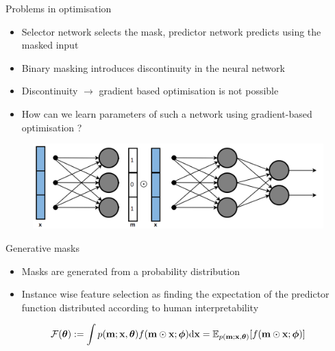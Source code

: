 \documentclass[11pt,compress,t,notes=noshow, aspectratio=169, xcolor=table]{beamer}
\begin{document}
	
\begin{frame}{Problems in optimisation}
    \begin{itemize}
        \item Selector network selects the mask, predictor network predicts using the masked input
        \item Binary masking introduces discontinuity in the neural network
\item Discontinuity $\rightarrow$ gradient based optimisation is not possible
\bigskip
\item How can we learn parameters of such a network using gradient-based optimisation ?
    \end{itemize}
    \begin{figure}
        \centering
        \includegraphics[scale=.43]{bild16}
    \end{figure}
\end{frame}	

\begin{frame}{Generative masks}
    \begin{itemize}
        \item Masks are generated from a probability distribution
        \item Instance wise feature selection as finding the expectation of the predictor function
distributed according to human interpretability
    \end{itemize}
    \bigskip
   \begin{equation*}
             \centering
    \mathcal{F}(\boldsymbol{\theta}):=\int p(\mathbf{m} ; \mathbf{x}, \boldsymbol{\theta}) f(\mathbf{m} \odot \mathbf{x} ; \boldsymbol{\phi}) \mathrm{d} \mathbf{x}=\mathbb{E}_{p(\mathbf{m} ; \mathbf{x}, \boldsymbol{\theta})}[f(\mathbf{m} \odot \mathbf{x} ; \boldsymbol{\phi})]
\end{equation*}
    
    
    
\end{frame}
	
\end{document}
